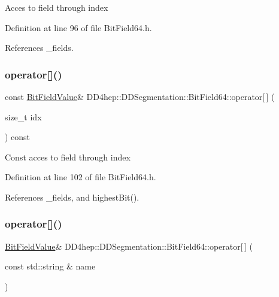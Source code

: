 Acces to field through index 

Definition at line 96 of file Bit\+Field64.\+h.



References \+\_\+fields.

\hypertarget{class_d_d4hep_1_1_d_d_segmentation_1_1_bit_field64_a47f84b0e8b89e9e45ecf502fb20b02f4}{}\label{class_d_d4hep_1_1_d_d_segmentation_1_1_bit_field64_a47f84b0e8b89e9e45ecf502fb20b02f4} 
\subsubsection{\texorpdfstring{operator[]()}{operator[]()}\hspace{0.1cm}{\footnotesize\ttfamily [2/4]}}
{\footnotesize\ttfamily const \hyperlink{class_d_d4hep_1_1_d_d_segmentation_1_1_bit_field_value}{Bit\+Field\+Value}\& D\+D4hep\+::\+D\+D\+Segmentation\+::\+Bit\+Field64\+::operator\mbox{[}$\,$\mbox{]} (\begin{DoxyParamCaption}\item[{size\+\_\+t}]{idx }\end{DoxyParamCaption}) const\hspace{0.3cm}{\ttfamily [inline]}}

Const acces to field through index 

Definition at line 102 of file Bit\+Field64.\+h.



References \+\_\+fields, and highest\+Bit().

\hypertarget{class_d_d4hep_1_1_d_d_segmentation_1_1_bit_field64_a452aca96e8536e9fc262b7d5255f0e02}{}\label{class_d_d4hep_1_1_d_d_segmentation_1_1_bit_field64_a452aca96e8536e9fc262b7d5255f0e02} 
\subsubsection{\texorpdfstring{operator[]()}{operator[]()}\hspace{0.1cm}{\footnotesize\ttfamily [3/4]}}
{\footnotesize\ttfamily \hyperlink{class_d_d4hep_1_1_d_d_segmentation_1_1_bit_field_value}{Bit\+Field\+Value}\& D\+D4hep\+::\+D\+D\+Segmentation\+::\+Bit\+Field64\+::operator\mbox{[}$\,$\mbox{]} (\begin{DoxyParamCaption}\item[{const std\+::string \&}]{name }\end{DoxyParamCaption})\hspace{0.3cm}{\ttfamily [inline]}}

